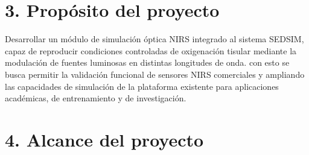 \documentclass[
11pt, %
]{charter}
\begin{document}


\section{3. Propósito del proyecto}
\label{sec:proposito}


Desarrollar un módulo de simulación óptica NIRS integrado al sistema SEDSIM, capaz de reproducir condiciones controladas de oxigenación tisular mediante la modulación de fuentes luminosas en distintas longitudes de onda. con esto se busca permitir la validación funcional de sensores NIRS comerciales y ampliando las capacidades de simulación de la plataforma existente para aplicaciones académicas, de entrenamiento y de investigación.


\section{4. Alcance del proyecto}
\label{sec:alcance}
\end{document}
